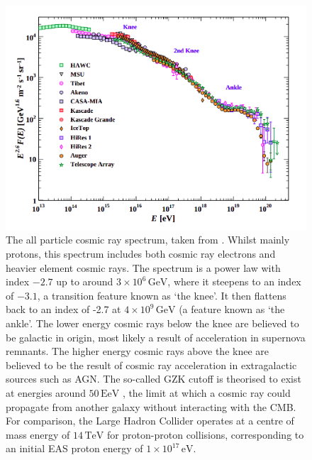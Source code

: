 \begin{figure}
\begin{center}  

\includegraphics[width=\columnwidth]{figures/pdgcr.png}
 
\caption{The all particle cosmic ray spectrum, taken from \cite{pdg}. Whilst mainly protons, this spectrum includes both cosmic ray electrons and heavier element cosmic rays. The spectrum is a power law with index $\mathrm{-2.7}$ up to around $\mathrm{3 \times 10^6\,GeV}$, where it steepens to an index of $\mathrm{-3.1}$, a transition feature known as `the knee'. It then flattens back to an index of -2.7 at $\mathrm{4 \times 10^9\,GeV}$ (a feature known as `the ankle'. The lower energy cosmic rays below the knee are believed to be galactic in origin, most likely a result of acceleration in supernova remnants. The higher energy cosmic rays above the knee are believed to be the result of cosmic ray acceleration in extragalactic sources such as AGN. The so-called GZK cutoff is theorised to exist at energies around $\mathrm{50\,EeV}$ \cite{gzk}, the limit at which a cosmic ray could propagate from another galaxy without interacting with the CMB. For comparison, the Large Hadron Collider operates at a centre of mass energy of $\mathrm{14\,TeV}$ for proton-proton collisions, corresponding to an initial EAS proton energy of $\mathrm{1\times 10^{17}\,eV}$.}
\label{fig:crspec}
\end{center}
\end{figure}

